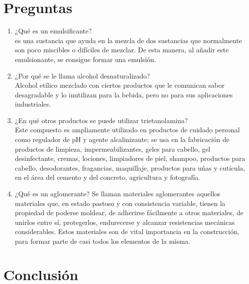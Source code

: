 \documentclass[12pt]{article}
\begin{document}
\section{Preguntas}
\begin{enumerate}
	\item ¿Qué es un emulsificante?\\
	es una sustancia que ayuda en la mezcla de dos sustancias que normalmente son poco miscibles o difíciles de mezclar. De esta manera, al añadir este emulsionante, se consigue formar una emulsión.
	\item ¿Por qué se le llama alcohol desnaturalizado?\\
	Alcohol etílico mezclado con ciertos productos que le comunican sabor desagradable y lo inutilizan para la bebida, pero no para sus aplicaciones industriales.
	\item ¿En qué otros productos se puede utilizar trietanolamina?\\
	Este compuesto es ampliamente utilizado en productos de cuidado personal como regulador de pH y agente alcalinizante; se usa en la fabricación de productos de limpieza, impermeabilizantes, geles para cabello, gel desinfectante, cremas, lociones, limpiadores de piel, shampoo, productos para cabello, desodorantes, fragancias, maquillaje, productos para uñas y cutícula, en el área del cemento y del concreto, agricultura y fotografía.
	\item ¿Qué es un aglomerante?
	Se llaman materiales aglomerantes aquellos materiales que, en estado pastoso y con consistencia variable, tienen la propiedad de poderse moldear, de adherirse fácilmente a otros materiales, de unirlos entre sí, protegerlos, endurecerse y alcanzar resistencias mecánicas considerables. Estos materiales son de vital importancia en la construcción, para formar parte de casi todos los elementos de la misma.
\end{enumerate}
\section{Conclusión}
\end{document}
